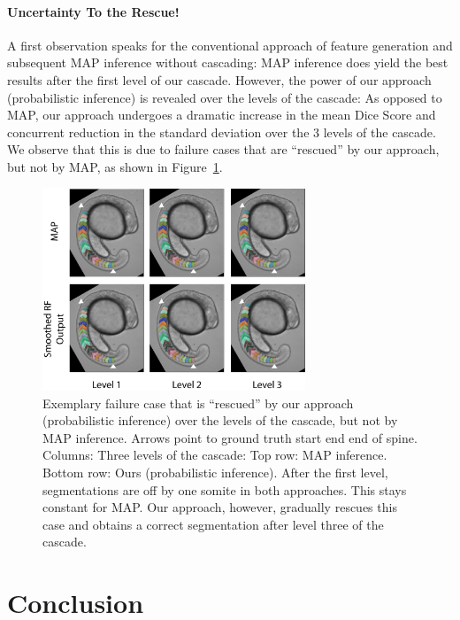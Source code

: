 \documentclass[10pt,twocolumn,letterpaper]{article}
\begin{document}
\paragraph{Uncertainty To the Rescue! }
%
A first observation speaks for the conventional approach of feature generation and subsequent MAP inference without cascading: MAP inference does yield the best results after the first level of our cascade. However, the power of our approach (probabilistic inference) is revealed over the levels of the cascade: As opposed to MAP, our approach undergoes a dramatic increase in the mean Dice Score and concurrent reduction in the standard deviation over the 3 levels of the cascade. We observe that this is due to failure cases that are ``rescued'' by our approach, but not by MAP, as shown in Figure~\ref{fig:rescue}. 
%
\begin{figure}[t]
\begin{center}
\includegraphics[width=0.7\textwidth]{rescue.png} %
\caption{Exemplary failure case that is ``rescued'' by our approach (probabilistic inference) over the levels of the cascade, but not by MAP inference. Arrows point to ground truth start end end of spine. Columns: Three levels of the cascade: Top row: MAP inference. Bottom row: Ours (probabilistic inference). After the first level, segmentations are off by one somite in both approaches. This stays constant for MAP. Our approach, however, gradually rescues this case and obtains a correct segmentation after level three of the cascade.}
\label{fig:rescue}
\end{center}
\end{figure}
%

\section{Conclusion}

{\small


}
\end{document}
